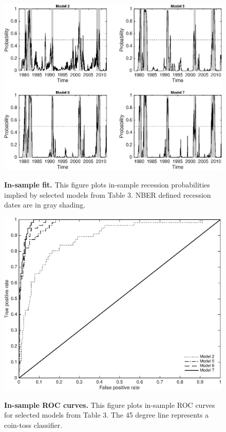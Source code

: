 \documentclass[12pt,a4paper,onecolumn,oneside,notitlepage]{article}
\begin{document}
\clearpage
\begin{figure}[htbp]
    \caption{
        \textbf{In-sample fit.} \newline 
        This figure plots in-sample recession probabilities implied by selected models from Table 3. NBER defined recession dates are in gray shading.
    }
    \centering
    \includegraphics[scale=1]{Figures/Figure2.eps} 
     \label{fig:isfit}
\end{figure}

\clearpage
\begin{figure}[htbp]
    \caption{
        \textbf{In-sample ROC curves.} \newline 
        This figure plots in-sample ROC curves for selected models from Table 3. The 45 degree line represents a coin-toss classifier.
    }
    \centering
    \includegraphics[scale=1]{Figures/Figure4.eps} 
    \label{fig:isroc}
\end{figure}
\end{document}
